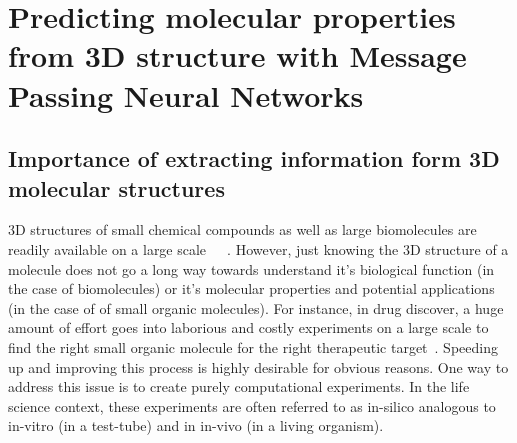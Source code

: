 \section{Predicting molecular properties from 3D structure with Message Passing Neural Networks}
\label{3d-molecules-for-gcnns}

\subsection{Importance of extracting information form 3D molecular structures}

3D structures of small chemical compounds as well as large biomolecules are readily available on a large scale~\cite{Ruddigkeit2012}~\cite{Chen2019}~\cite{Ramakrishnan2014}.
However, just knowing the 3D structure of a molecule does not go a long way towards understand it's biological function (in the case of biomolecules) or it's molecular properties and potential applications (in the case of of small organic molecules). For instance, in drug discover, a huge amount of effort goes into laborious and costly experiments on a large scale to find the right small organic molecule for the right therapeutic target~\cite{Fda-drug-discovery}. Speeding up and improving this process is highly desirable for obvious reasons. 
One way to address this issue is to create purely computational experiments. In the life science context, these experiments are often referred to as in-silico analogous to in-vitro (in a test-tube) and in in-vivo (in a living organism).



